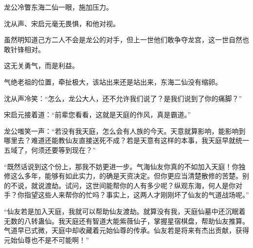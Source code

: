 \begin{this_body}
龙公冷瞥东海二仙一眼，施加压力。

沈从声、宋启元毫无畏惧，和他对视。

虽然明知道己方二人不会是龙公的对手，但上一世他们敢争夺龙宫，这一世自然也敢针锋相对。

这无关勇气，而是利益。

气绝老祖的位置，牵扯极大，该站出来还是站出来，东海二仙没有缩卵。

沈从声冷笑：“怎么，龙公大人，还不允许我们说了？是我们说到了你的痛脚？”

宋启元接着道：“前辈您看看，这就是天庭的作风，真是霸道。”

龙公嗤笑一声：“若没有我天庭，怎么会有人族的今天。天意就算影响，能影响到哪里去？难道还能教仙友直接送死不成？若是天意有这样的本事，我天庭早就统一五域了，何须还要等到现在？”

“既然话说到这个份上，那我不妨更进一步。气海仙友你真的不如加入天庭！你独修这么多年，能够有如此实力，的确是天资决定。但你更应当清楚散修的苦楚。别的不说，就说渡劫。试问，这世间能帮你的人有多少呢？纵观东海，何人是你对手？你指望这些人来帮你的忙吗？事实上，这两人才刚刚坏了仙友的气道战场呢。”

“仙友若是加入天庭，我就可以帮助仙友渡劫。就算没有我，天庭仙墓中还沉眠着无数的八转蛊仙。我天庭还有智道大能紫薇仙子，掌握星宿棋盘，帮助仙友推算。气道早已式微，天庭中却收藏着元始仙尊的传承。仙友若是将来有杰出贡献，获得元始仙尊也不是不可能啊！”

\end{this_body}


